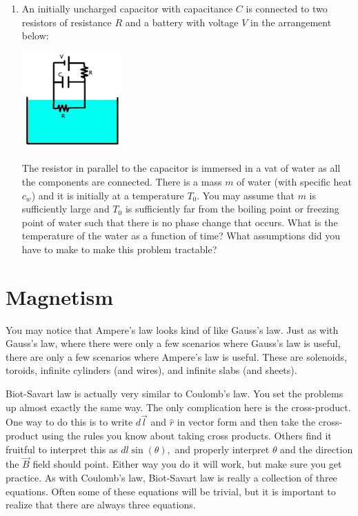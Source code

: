 \documentclass[12pt]{book}
\begin{document}
\begin{enumerate}
\pagebreak

\item An initially uncharged capacitor with capacitance $C$ is connected to two resistors of resistance $R$ and a battery with voltage $V$ in the arrangement below:

\begin{center}
 \includegraphics[width=0.3\textwidth]{Prelab5S22014.png}
\end{center}


\noindent The resistor in parallel to the capacitor is immersed in a vat of water as all the components are connected. There is a mass $m$ of water (with specific heat $c_w$) and it is initially at a temperature $T_0.$ You may assume that $m$ is sufficiently large and $T_0$ is sufficiently far from the boiling point or freezing point of water such that there is no phase change that occurs. What is the temperature of the water as a function of time? What assumptions did you have to make to make this problem tractable?


\end{enumerate}

\chapter{Magnetism}

You may notice that Ampere's law looks kind of like Gauss's law. Just as with Gauss's law, where there were only a few scenarios where Gauss's law is useful, there are only a few scenarios where Ampere's law is useful. These are solenoids, toroids, infinite cylinders (and wires), and infinite slabs (and sheets).

Biot-Savart law is actually very similar to Coulomb's law. You set the problems up almost exactly the same way. The only complication here is the cross-product. One way to do this is to write $d\vec{l}$ and $\hat{r}$ in vector form and then take the cross-product using the rules you know about taking cross products. Others find it fruitful to interpret this as $dl \sin(\theta),$ and properly interpret $\theta$ and the direction the $\vec{B}$ field should point. Either way you do it will work, but make sure you get practice. As with Coulomb's law, Biot-Savart law is really a collection of three equations. Often some of these equations will be trivial, but it is important to realize that there are always three equations.
\end{document}
